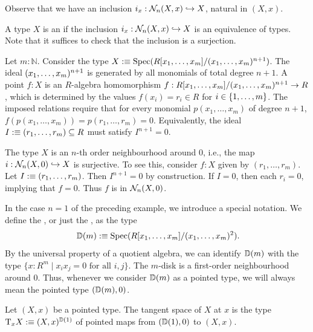 Observe that we have an inclusion $i_x : \hood{X,x}{n} \hookrightarrow X$, natural in $(X,x)$.

\begin{definition}\label{def:hood}
  A type $X$ is an  if the inclusion $i_x : \hood{X,x}{n} \hookrightarrow X$ is an equivalence of types.
  Note that it suffices to check that the inclusion is a surjection.
\end{definition}

\begin{example}\label{ex:R[x]/(x^{n+1})}
  Let $m : \mathbb{N}$.
  Consider the type $X \defeq \Spec(\quot{R[x_1, \dots, x_m]}{\ideal{x_1, \dots, x_m}^{n+1}})$.
  The ideal $\ideal{x_1, \dots, x_m}^{n+1}$ is generated by all monomials of total degree $n+1$.
  A point $f : X$ is an $R$-algebra homomorphism $f : \quot{R[x_1, \dots, x_m]}{\ideal{x_1, \dots, x_m}^{n+1}} \to R$, which is determined by the values $f(x_i) = r_i \in R$ for $i \in \set{1,\dots,m}$.
  The imposed relations require that for every monomial $p(x_1, \dots, x_m)$ of degree $n+1$, $f(p(x_1, \dots, x_m)) = p(r_1, \dots, r_m) = 0$.
  Equivalently, the ideal $I \defeq \ideal{r_1, \dots, r_m} \subseteq R$ must satisfy $I^{n+1} = 0$.

  The type $X$ is an $n$-th order neighbourhood around $0$, i.e., the map $i : \hood{X,0}{n} \hookrightarrow X$ is surjective.
  To see this, consider $f : X$ given by $(r_1, \dots, r_m)$.
  Let $I \defeq \ideal{r_1, \dots, r_m}$. Then $I^{n+1} = 0$ by construction.
  If $I = 0$, then each $r_i=0$, implying that $f = 0$.
  Thus $f$ is in $\hood{X,0}{n}$.
\end{example}

In the case $n=1$ of the preceding example, we introduce a special notation.
We define the , or just the , as the type
\[
  \D(m) \defeq \Spec(\quot{R[x_1,\dots, x_m]}{\ideal{x_1,\dots,x_m}^2})\rlap{.}
\]
By the universal property of a quotient algebra, we can identify $\D(m)$ with the type $\{ x : R^m \mid x_ix_j = 0 \text{ for all } i,j \}$.
The $m$-disk is a first-order neighbourhood around $0$.
Thus, whenever we consider $\D(m)$ as a pointed type, we will always mean the pointed type $(\D(m), 0)$.

\begin{definition}\label{def:tangent}
  Let $(X,x)$ be a pointed type.
  The tangent space of $X$ at $x$ is the type $\tangent{X}{x} \defeq (X,x)^{\D(1)}$
  of pointed maps from $(\D(1),0)$ to $(X,x).$
\end{definition}

